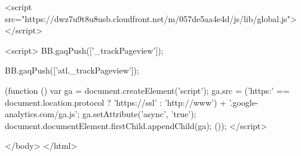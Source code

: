   <script src="https://dwz7u9t8u8usb.cloudfront.net/m/057de5aa4e4d/js/lib/global.js"></script>






  <script>
    BB.gaqPush(['_trackPageview']);
  
    BB.gaqPush(['atl._trackPageview']);

    

    

    (function () {
        var ga = document.createElement('script');
        ga.src = ('https:' == document.location.protocol ? 'https://ssl' : 'http://www') + '.google-analytics.com/ga.js';
        ga.setAttribute('async', 'true');
        document.documentElement.firstChild.appendChild(ga);
    }());
  </script>

</body>
</html>
